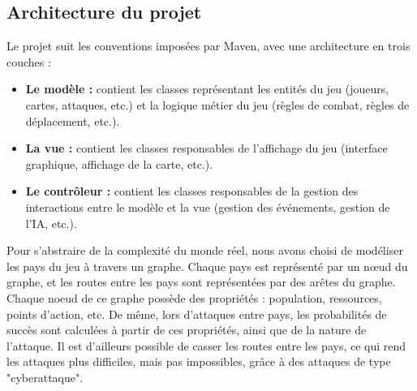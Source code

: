 \documentclass{article}
\begin{document}
\subsection{Architecture du projet}
Le projet suit les conventions imposées par Maven, avec une architecture en trois couches :
\begin{itemize}
    \item \textbf{Le modèle :} contient les classes représentant les entités du jeu (joueurs, cartes, attaques, etc.) et la logique métier du jeu (règles de combat, règles de déplacement, etc.).
    \item \textbf{La vue :} contient les classes responsables de l'affichage du jeu (interface graphique, affichage de la carte, etc.).
    \item \textbf{Le contrôleur :} contient les classes responsables de la gestion des interactions entre le modèle et la vue (gestion des événements, gestion de l'IA, etc.).
\end{itemize}

Pour s'abstraire de la complexité du monde réel, nous avons choisi de modéliser les pays du jeu à travers un graphe. Chaque pays est représenté par un nœud du graphe, et les routes entre les pays sont représentées par des arêtes du graphe.\\
Chaque noeud de ce graphe possède des propriétés : population, ressources, points d'action, etc. De même, lors d'attaques entre pays, les probabilités de succès sont calculées à partir de ces propriétés, ainsi que de la nature de l'attaque. Il est d'ailleurs possible de casser les routes entre les pays, ce qui rend les attaques plus difficiles, mais pas impossibles, grâce à des attaques de type "cyberattaque".
\end{document}
